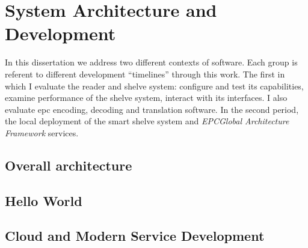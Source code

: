 \chapter{System Architecture and Development} \label{sec:systemdevelopment}

In this dissertation we address two different contexts of software. Each group is referent to different development ``timelines'' through this work. The first in which I evaluate the reader and shelve system: configure and test its capabilities, examine performance of the shelve system, interact with its interfaces. I also evaluate \ac{epc} encoding, decoding and translation software.
In the second period, the local deployment of the smart shelve system and \emph{EPCGlobal Architecture Framework} services.

\section{Overall architecture}

 

\section{Hello World}

\section{Cloud and Modern Service Development}

